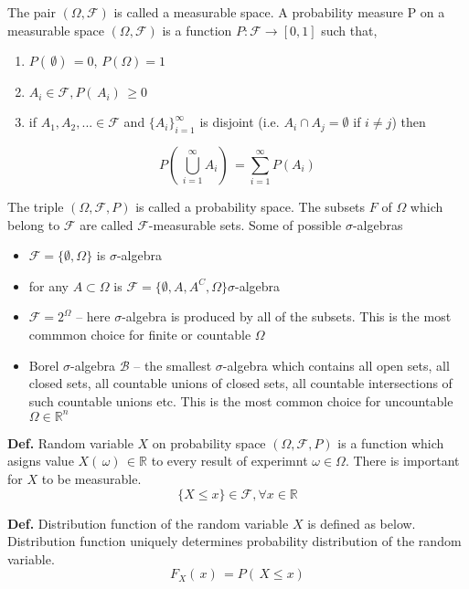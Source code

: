 \documentclass[thesis=M,english]{FITthesis}[2019/12/23]
\begin{document}
The pair $(\Omega, \mathcal{F})$ is called a measurable space. A probability measure P on a measurable space $(\Omega, \mathcal{F})$ is a function $P: \mathcal{F}\to [0,1]$ such that,
\begin{enumerate}[label=(\roman*)]
\item $P(\, \emptyset ) \, = 0$, $P(\Omega) = 1$
\item $A_i \in \mathcal{F}, P( \, A_i ) \, \geq 0$
\item if $A_1,A_2,... \in \mathcal{F}$ and $\{A_i\}_{i=1}^{\infty}$ is disjoint (i.e. $A_i \cap A_j = \emptyset$ if $i \neq j$) then
\end{enumerate}

\begin{equation*}
    P( \, \bigcup_{i=1}^{\infty}A_i) \, = \sum_{i=1}^{\infty}P(A_i)
\end{equation*}

The triple $(\Omega, \mathcal{F}, P)$ is called a probability space. The subsets $F$ of $\Omega$ which belong to $\mathcal{F}$ are called $\mathcal{F}$-measurable sets. 
Some of possible $\sigma$-algebras
\begin{itemize}
		\item $\mathcal{F} = \{\emptyset,\Omega\}$ is $\sigma$-algebra
		\item for any $A \subset \Omega$ is $\mathcal{F} = \{\emptyset,A,A^C,\Omega\} \sigma$-algebra
		\item $\mathcal{F} = 2^\Omega$ -- here $\sigma$-algebra is produced by all of the subsets. This is the most commmon choice for finite or countable $\Omega$
		\item Borel $\sigma$-algebra $\mathcal{B}$ -- the smallest $\sigma$-algebra which contains all open sets, all closed sets, all countable unions of closed sets, all countable intersections of such countable unions etc. This is the most common choice for uncountable $\Omega \in \mathbb{R}^n$
	\end{itemize}

\textbf{Def.} Random variable $X$ on probability space $(\Omega, \mathcal{F}, P)$ is a function which asigns value $X( \, \omega) \, \in \mathbb{R}$ to every result of experimnt $\omega \in \Omega$. There is important for $X$ to be measurable.
\begin{equation*}
    \{X \leq x\} \in \mathcal{F}, \forall x \in \mathbb{R}
\end{equation*}

\textbf{Def.} Distribution function of the random variable $X$ is defined as below. Distribution function uniquely determines probability distribution of the random variable.
\begin{equation*}
    F_X( \,x) \, = P( \,X \leq x )
\end{equation*}
\end{document}
